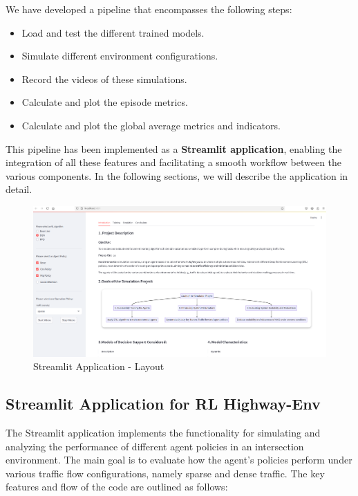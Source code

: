 We have developed a pipeline that encompasses the following steps:
\begin{itemize}
    \item Load and test the different trained models.
    \item Simulate different environment configurations.
    \item Record the videos of these simulations.
    \item Calculate and plot the episode metrics.
    \item Calculate and plot the global average metrics and indicators.
\end{itemize}

This pipeline has been implemented as a \textbf{Streamlit application}, enabling the integration of all these features and facilitating a smooth 
workflow between the various components. In the following sections, we will describe the application in detail.

\begin{figure}[H]
    \centering
    \includegraphics[height=0.35\textheight]{images/app_intro.png} 
    \caption{Streamlit Application - Layout}
\end{figure}


\subsection{Streamlit Application for RL Highway-Env}

The Streamlit application implements the functionality for simulating and analyzing the performance of different agent policies in an intersection environment.
The main goal is to evaluate how the agent's policies perform under various traffic flow configurations, namely sparse and dense traffic. 
The key features and flow of the code are outlined as follows:

